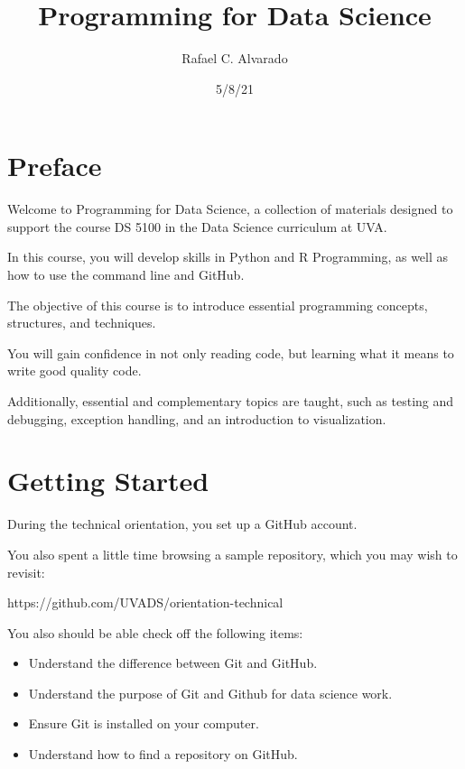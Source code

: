 \documentclass[
  letterpaper,
  DIV=11,
  numbers=noendperiod]{scrreport}
\title{Programming for Data Science}
\author{Rafael C. Alvarado}
\date{5/8/21}
\providecommand{\tightlist}{%
  \setlength{\itemsep}{0pt}\setlength{\parskip}{0pt}}\usepackage{longtable,booktabs,array}
\renewcommand*\contentsname{Table of contents}
\newcommand\contentsname{Table of contents}
\begin{document}
\maketitle
\ifdefined\Shaded\renewenvironment{Shaded}{\begin{tcolorbox}[interior hidden, borderline west={3pt}{0pt}{shadecolor}, enhanced, boxrule=0pt, sharp corners, frame hidden, breakable]}{\end{tcolorbox}}\fi

\renewcommand*\contentsname{Table of contents}
{
\hypersetup{linkcolor=}
\setcounter{tocdepth}{2}
\tableofcontents
}
\part{Preface}

Welcome to Programming for Data Science, a collection of materials
designed to support the course DS 5100 in the Data Science curriculum at
UVA.

In this course, you will develop skills in Python and R Programming, as
well as how to use the command line and GitHub.

The objective of this course is to introduce essential programming
concepts, structures, and techniques.

You will gain confidence in not only reading code, but learning what it
means to write good quality code.

Additionally, essential and complementary topics are taught, such as
testing and debugging, exception handling, and an introduction to
visualization.

\part{Getting Started}

During the technical orientation, you set up a GitHub account.

You also spent a little time browsing a sample repository, which you may
wish to revisit:

https://github.com/UVADS/orientation-technical

You also should be able check off the following items:

\begin{itemize}
\tightlist
\item
  Understand the difference between Git and GitHub.
\item
  Understand the purpose of Git and Github for data science work.
\item
  Ensure Git is installed on your computer.
\item
  Understand how to find a repository on GitHub.
\end{itemize}
\end{document}
